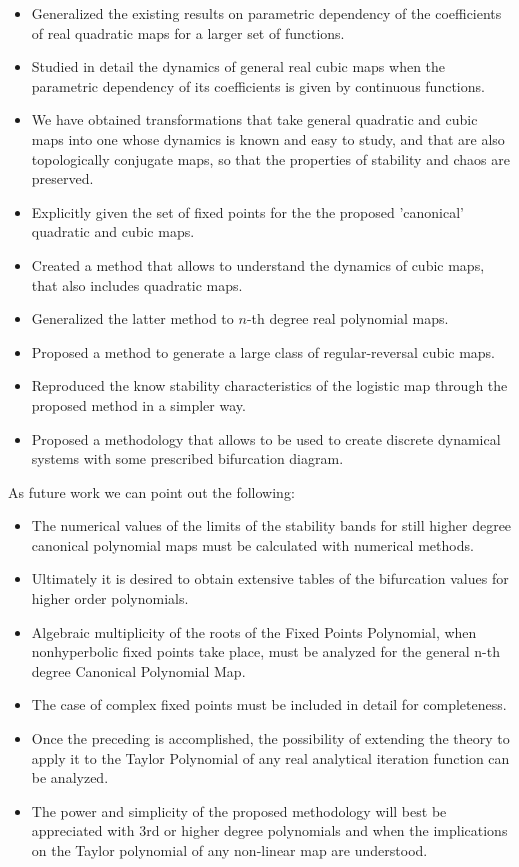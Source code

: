 \documentclass[10pt,twoside,titlepage]{book}
\numberwithin{equation}{chapter}
\numberwithin{figure}{chapter}
\numberwithin{table}{chapter}
\theoremstyle{plain}%
\theoremstyle{definition}
\theoremstyle{remark}
\begin{document}
\begin{itemize}
	\item Generalized the existing results on parametric dependency of the coefficients of real quadratic maps for a larger set of functions.
	\item Studied in detail the dynamics of general real cubic maps when the parametric dependency of its coefficients is given by continuous functions.
	\item We have obtained transformations that take general quadratic and cubic maps into one whose dynamics is known and easy to study, and that are also topologically conjugate maps, so that the properties of stability and chaos are preserved.
	\item Explicitly given the set of fixed points for the the proposed 'canonical' quadratic and cubic maps.
	\item Created a method that allows to understand the dynamics of cubic maps, that also includes quadratic maps.
	\item Generalized the latter method to $n$-th degree real polynomial maps.
	\item Proposed a method to generate a large class of regular-reversal cubic maps.
	\item Reproduced the know stability characteristics of the logistic map through the proposed method in a simpler way.
	\item Proposed a methodology that allows to be used to create discrete dynamical systems with some prescribed bifurcation diagram.
\end{itemize}

As future work we can point out the following:

\begin{itemize}
	\item The numerical values of the limits of the stability bands for still higher degree canonical polynomial maps must be calculated with numerical methods.
	\item Ultimately it is desired to obtain extensive tables of the bifurcation values for higher order polynomials.
	\item Algebraic multiplicity of the roots of the Fixed Points Polynomial, when nonhyperbolic fixed points take place, must be analyzed for the general n-th degree Canonical Polynomial Map.
	\item The case of complex fixed points must be included in detail for completeness.
	\item Once the preceding is accomplished, the possibility of extending the theory to apply it to the Taylor Polynomial of any real analytical iteration function can be analyzed.
	\item The power and simplicity of the proposed methodology will best be appreciated with 3rd or higher degree polynomials and when the implications on the Taylor polynomial of any non-linear map are understood.
\end{itemize}
\end{document}
